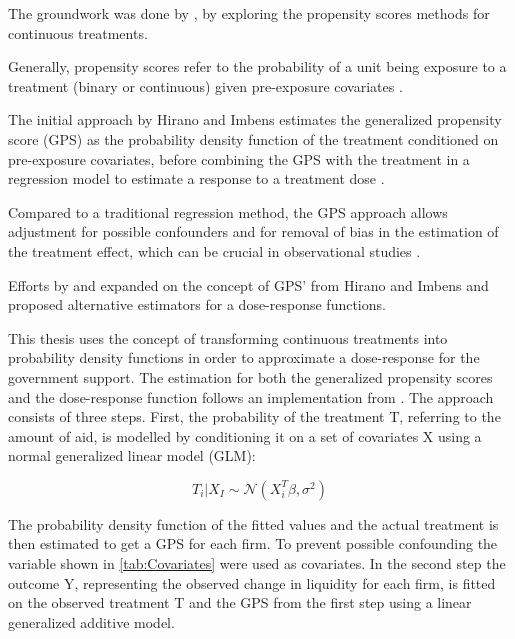 The groundwork was done by \parencite{hirano_propensity_2004}, by exploring the propensity scores methods for continuous treatments. 

Generally, propensity scores refer to the probability of a unit being exposure to a treatment (binary or continuous) given pre-exposure covariates \parencite{rosenbaum_central_1983}. 

The initial approach by Hirano and Imbens estimates the generalized propensity score (GPS) as the probability density function of the treatment conditioned on pre-exposure covariates, before combining the GPS with the treatment in a regression model to estimate a response to a treatment dose \parencite{hirano_propensity_2004}.

Compared to a traditional regression method, the GPS approach allows adjustment for possible confounders and for removal of bias in the estimation of the treatment effect, which can be crucial in observational studies \parencite{wu_matching_2021,moodie_estimation_2012}. 

Efforts by \parencite{moodie_estimation_2012} and \parencite{galagate_causal_2016} expanded on the concept of GPS' from Hirano and Imbens and proposed alternative estimators for a dose-response functions.



This thesis uses the concept of transforming continuous treatments into probability density functions in order to approximate a dose-response for the government support. The estimation for both the generalized propensity scores and the dose-response function follows an implementation from \parencite{kobrosly_causal-curve_2020}. 
The approach consists of three steps. First, the probability of the treatment T, referring to the amount of aid, is modelled by conditioning it on a set of covariates X using a normal generalized linear model (GLM):


\begin{equation}
    T_{i}|X_{I}\sim \mathcal{N} (X^{T}_{i}\beta,\sigma^{2})
    \label{eqn:densit}
\end{equation}

The probability density function of the fitted values and the actual treatment is then estimated to get a GPS for each firm. To prevent possible confounding the variable shown in \ref{tab:Covariates} were used as covariates. 
In the second step the outcome Y, representing the observed change in liquidity for each firm, is fitted on the observed treatment T and the GPS from the first step using a linear generalized additive model. 

